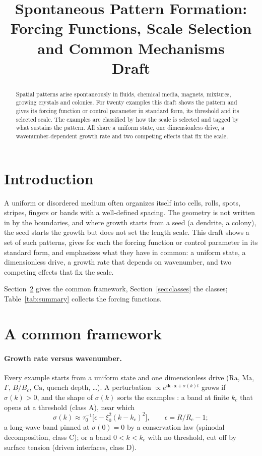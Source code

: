 \documentclass[11pt]{article}
\title{Spontaneous Pattern Formation:\\ Forcing Functions, Scale Selection and Common Mechanisms\\[-8pt]{\large Draft}}
\author{}
\date{}
\begin{document}
\maketitle


\begin{abstract}
Spatial patterns arise spontaneously in fluids, chemical media, magnets, mixtures, growing crystals and colonies. For twenty examples this draft shows the pattern and gives its forcing function or control parameter in standard form, its threshold and its selected scale. The examples are classified by how the scale is selected and tagged by what sustains the pattern. All share a uniform state, one dimensionless drive, a wavenumber-dependent growth rate and two competing effects that fix the scale.
\end{abstract}

\section{Introduction}

A uniform or disordered medium often organizes itself into cells, rolls, spots, stripes, fingers or bands with a well-defined spacing. The geometry is not written in by the boundaries, and where growth starts from a seed (a dendrite, a colony), the seed starts the growth but does not set the length scale. This draft shows a set of such patterns, gives for each the forcing function or control parameter in its standard form, and emphasizes what they have in common: a uniform state, a dimensionless drive, a growth rate that depends on wavenumber, and two competing effects that fix the scale.

Section~\ref{sec:framework} gives the common framework, Section~\ref{sec:classes} the classes; Table~\ref{tab:summary} collects the forcing functions.

\section{A common framework}\label{sec:framework}

\paragraph{Growth rate versus wavenumber.} Every example starts from a uniform state and one dimensionless drive ($\mathrm{Ra}$, $\mathrm{Ma}$, $\Gamma$, $B/B_c$, $\mathrm{Ca}$, quench depth, \dots). A perturbation $\propto e^{i\mathbf{k}\cdot\mathbf{x}+\sigma(k)t}$ grows if $\sigma(k)>0$, and the shape of $\sigma(k)$ sorts the examples \cite{CH}: a band at finite $k_c$ that opens at a threshold (class A), near which
\[
\sigma(k)\approx\tau_0^{-1}\bigl[\epsilon-\xi_0^2(k-k_c)^2\bigr],\qquad \epsilon=R/R_c-1;
\]
a long-wave band pinned at $\sigma(0)=0$ by a conservation law (spinodal decomposition, class C); or a band $0<k<k_c$ with no threshold, cut off by surface tension (driven interfaces, class D).
\end{document}
